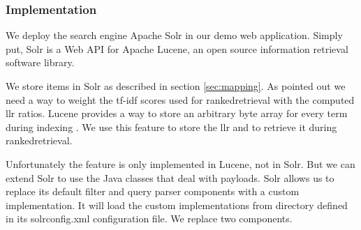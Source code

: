 \subsubsection{Implementation}
\label{sec:solrimpl}
We deploy the search engine Apache Solr in our demo web application. Simply put, Solr is a Web API for Apache Lucene, an open source information retrieval software library. 

We store items in Solr as described in section \ref{sec:mapping}. As pointed out we need a way to weight the tf-idf scores used for \gls{rankedretrieval} with the computed \gls{llr} ratios. Lucene provides a way to store an arbitrary byte array for every term during indexing \cite{McCandless}. We use this feature to store the \gls{llr} and to retrieve it during \gls{rankedretrieval}.

Unfortunately the feature is only implemented in Lucene, not in Solr. But we can extend Solr to use the Java classes that deal with payloads. Solr allows us to replace its default filter and query parser components with a custom implementation. It will load the custom implementations from directory defined in its solrconfig.xml configuration file. We replace two components.
